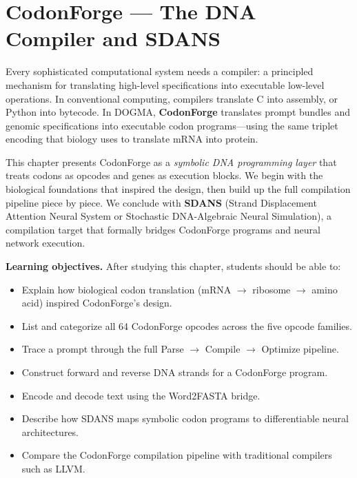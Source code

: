 
\chapter{CodonForge --- The DNA Compiler and SDANS}
\label{ch:codonforge}


\noindent
Every sophisticated computational system needs a compiler: a principled mechanism for translating high-level specifications into executable low-level operations. In conventional computing, compilers translate C into assembly, or Python into bytecode. In DOGMA, \textbf{CodonForge} translates prompt bundles and genomic specifications into executable codon programs---using the same triplet encoding that biology uses to translate mRNA into protein.

This chapter presents CodonForge as a \emph{symbolic DNA programming layer} that treats codons as opcodes and genes as execution blocks. We begin with the biological foundations that inspired the design, then build up the full compilation pipeline piece by piece. We conclude with \textbf{SDANS} (Strand Displacement Attention Neural System or Stochastic DNA-Algebraic Neural Simulation), a compilation target that formally bridges CodonForge programs and neural network execution.

\medskip

\noindent\textbf{Learning objectives.} After studying this chapter, students should be able to:
\begin{itemize}[leftmargin=1.8em]
  \item Explain how biological codon translation (mRNA $\to$ ribosome $\to$ amino acid) inspired CodonForge's design.
  \item List and categorize all 64 CodonForge opcodes across the five opcode families.
  \item Trace a prompt through the full Parse $\to$ Compile $\to$ Optimize pipeline.
  \item Construct forward and reverse DNA strands for a CodonForge program.
  \item Encode and decode text using the Word2FASTA bridge.
  \item Describe how SDANS maps symbolic codon programs to differentiable neural architectures.
  \item Compare the CodonForge compilation pipeline with traditional compilers such as LLVM.
\end{itemize}

